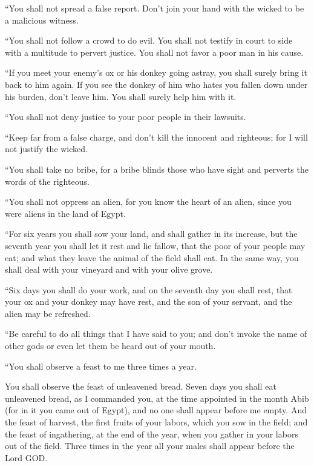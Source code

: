\mychapter{} \myverse*{}“You shall not spread a false report. Don’t join your hand with
the wicked to be a malicious witness.


\quad \myverse{}“You shall not follow a crowd to do evil. You shall not testify
in court to side with a multitude to pervert justice.
\myverse{}You shall not favor a poor man in his cause.


\myverse{}“If you meet your enemy’s ox or his donkey going astray, you shall
surely bring it back to him again.
\myverse{}If you see the donkey of him who hates you fallen down under his burden, don’t
leave him. You shall surely help him with it.


\myverse{}“You shall not deny justice to your poor people in their lawsuits.


\myverse{}“Keep far from a false charge, and don’t kill the innocent and
righteous; for I will not justify the wicked.


\myverse{}“You shall take no bribe, for a bribe blinds those who have sight
and perverts the words of the righteous.


\myverse{}“You shall not oppress an alien, for you know the heart of an
alien, since you were aliens in the land of Egypt.


\myverse{}“For six years you shall sow your land, and shall gather in
its increase,
\myverse{}but the seventh year you shall let it rest and lie fallow, that the poor
of your people may eat; and what they leave the animal of the field shall eat. In the same way, you shall
deal with your vineyard and with your olive grove.


\myverse{}“Six days you shall do your work, and on the seventh day you
shall rest, that your ox and your donkey may have rest, and the son of your servant, and the alien may
be refreshed.


\myverse{}“Be careful to do all things that I have said to you; and don’t
invoke the name of other gods or even let them be heard out of your mouth.


\myverse{}“You shall observe a feast to me three times a year.

\myverse{}You shall observe the feast of unleavened bread. Seven days you shall eat
unleavened bread, as I commanded you, at the time appointed in the month Abib (for in it you came out
of Egypt), and no one shall appear before me empty.
\myverse{}And the feast of harvest, the first fruits of your labors, which you sow
in the field; and the feast of ingathering, at the end of the year, when you gather in your labors out
of the field.
\myverse{}Three times in the year all your males shall appear before the Lord GOD.


